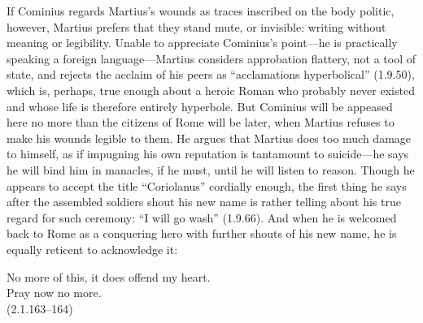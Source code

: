 If Cominius regards Martius's wounds as traces inscribed on the body politic, however, Martius prefers that they stand mute, or invisible: writing without meaning or legibility.
Unable to appreciate Cominius's point---he is practically speaking a foreign language---Martius considers approbation flattery, not a tool of state, and rejects the acclaim of his peers as ``acclamations hyperbolical'' (1.9.50), which is, perhaps, true enough about a heroic Roman who probably never existed and whose life is therefore entirely hyperbole.
But Cominius will be appeased here no more than the citizens of Rome will be later, when Martius refuses to make his wounds legible to them.
He argues that Martius does too much damage to himself, as if impugning his own reputation is tantamount to suicide---he says he will bind him in manacles, if he must, until he will listen to reason.
Though he appears to accept the title ``Coriolanus'' cordially enough, the first thing he says after the assembled soldiers shout his new name is rather telling about his true regard for such ceremony: ``I will go wash'' (1.9.66).
And when he is welcomed back to Rome as a conquering hero with further shouts of his new name, he is equally reticent to acknowledge it:
\begin{vq}
No more of this, it does offend my heart.\\
Pray now no more.\\
\hfill(2.1.163--164)
\end{vq}

